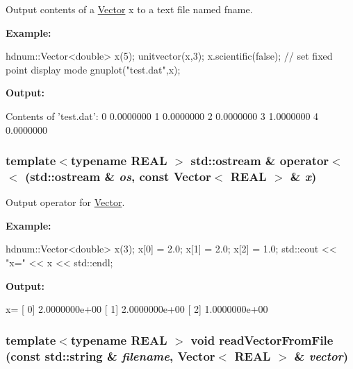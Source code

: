 Output contents of a \hyperlink{classhdnum_1_1Vector}{Vector} x to a text file named fname. 

{\bfseries Example:} 
\begin{DoxyCode}
  hdnum::Vector<double> x(5);
  unitvector(x,3);
  x.scientific(false); // set fixed point display mode
  gnuplot("test.dat",x);
\end{DoxyCode}


{\bfseries Output:} \begin{DoxyVerb}
Contents of 'test.dat':
              0      0.0000000
              1      0.0000000
              2      0.0000000
              3      1.0000000
              4      0.0000000
	  \end{DoxyVerb}
 \hypertarget{classhdnum_1_1Vector_a50345eaaa46f20d031cc751aa35e4232}{
\subsubsection[{operator$<$$<$}]{\setlength{\rightskip}{0pt plus 5cm}template$<$typename REAL $>$ std::ostream \& operator$<$$<$ (std::ostream \& {\em os}, \/  const {\bf Vector}$<$ REAL $>$ \& {\em x})}}
\label{classhdnum_1_1Vector_a50345eaaa46f20d031cc751aa35e4232}


Output operator for \hyperlink{classhdnum_1_1Vector}{Vector}. 

{\bfseries Example:} 
\begin{DoxyCode}
  hdnum::Vector<double> x(3);
  x[0] = 2.0;
  x[1] = 2.0;
  x[2] = 1.0;
  std::cout << "x=" << x << std::endl;
\end{DoxyCode}


{\bfseries Output:} \begin{DoxyVerb}
x=
[ 0]  2.0000000e+00
[ 1]  2.0000000e+00
[ 2]  1.0000000e+00
	  \end{DoxyVerb}
 \hypertarget{classhdnum_1_1Vector_a4e37b684a0a8fec1d254c6dc142d34dd}{
\subsubsection[{readVectorFromFile}]{\setlength{\rightskip}{0pt plus 5cm}template$<$typename REAL $>$ void readVectorFromFile (const std::string \& {\em filename}, \/  {\bf Vector}$<$ REAL $>$ \& {\em vector})}}
\label{classhdnum_1_1Vector_a4e37b684a0a8fec1d254c6dc142d34dd}


